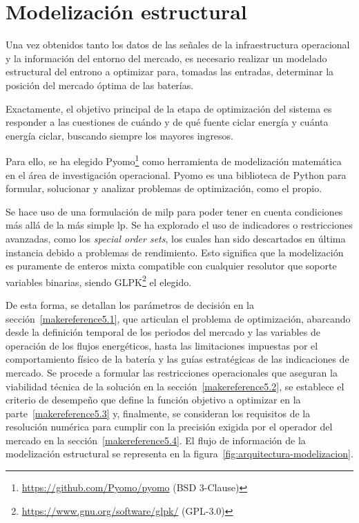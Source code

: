 
\cleardoublepage%

\chapter{Modelización estructural}%
\label{makereference5}

Una vez obtenidos tanto los datos de las señales de la infraestructura operacional y la información del entorno del mercado, es necesario realizar un modelado estructural del entrono a optimizar para, tomadas las entradas, determinar la posición del mercado óptima de las baterías.

Exactamente, el objetivo principal de la etapa de optimización del sistema es responder a las cuestiones de cuándo y de qué fuente ciclar energía y cuánta energía ciclar, buscando siempre los mayores ingresos.

Para ello, se ha elegido Pyomo\footnote{\url{https://github.com/Pyomo/pyomo} (BSD 3-Clause)} como herramienta de modelización matemática en el área de investigación operacional. Pyomo es una biblioteca de Python para formular, solucionar y analizar problemas de optimización, como el propio.

Se hace uso de una formulación de \gls{milp} para poder tener en cuenta condiciones más allá de la más simple \gls{lp}. Se ha explorado el uso de indicadores o restricciones avanzadas, como los \textit{special order sets}, los cuales han sido descartados en última instancia debido a problemas de rendimiento. Esto significa que la modelización es puramente de enteros mixta compatible con cualquier resolutor que soporte variables binarias, siendo GLPK\footnote{\url{https://www.gnu.org/software/glpk/} (GPL-3.0)} el elegido.

De esta forma, se detallan los parámetros de decisión en la sección~\ref{makereference5.1}, que articulan el problema de optimización, abarcando desde la definición temporal de los periodos del mercado y las variables de operación de los flujos energéticos, hasta las limitaciones impuestas por el comportamiento físico de la batería y las guías estratégicas de las indicaciones de mercado. Se procede a formular las restricciones operacionales que aseguran la viabilidad técnica de la solución en la sección~\ref{makereference5.2}, se establece el criterio de desempeño que define la función objetivo a optimizar en la parte~\ref{makereference5.3} y, finalmente, se consideran los requisitos de la resolución numérica para cumplir con la precisión exigida por el operador del mercado en la sección~\ref{makereference5.4}. El flujo de información de la modelización estructural se representa en la figura~\ref{fig:arquitectura-modelizacion}.

